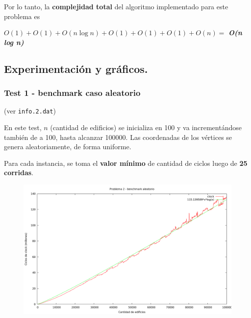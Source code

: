    
Por lo tanto, la \textbf{complejidad total} del algoritmo implementado para este problema es
 
\begin{center}
  $O(1) + O(1) + O(n \log n) + O(1) + O(1) + O(1) + O(n) =$ \textit{\textbf{O(n log n)}}
\end{center}


\newpage


\subsection{Experimentación y gráficos.}

\vspace*{0.3cm}

\subsubsection{Test 1 - benchmark caso aleatorio}

(ver \verb|info.2.dat|) \medskip

En este test, $n$ (cantidad de edificios) se inicializa en 100 y va incrementándose también de a 100, 
hasta alcanzar 100000. Las coordenadas de los vértices se genera aleatoriamente, de forma uniforme.
 
Para cada instancia, se toma el \textbf{valor mínimo} de cantidad de ciclos luego de \textbf{25 corridas}. 

\vspace*{0.5cm}

\begin{figure}[h]
  \begin{center}
    \includegraphics[scale=0.35]{imagenes/grafico-2.png}
  \end{center}
\end{figure}

